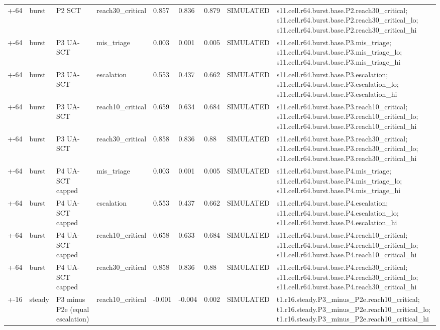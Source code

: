 \begin{table}[t]
\begin{tabular}{lllllllll}
+-64 & burst & P2 SCT & reach30\_critical & 0.857 & 0.836 & 0.879 & SIMULATED & s11.cell.r64.burst.base.P2.reach30\_critical; s11.cell.r64.burst.base.P2.reach30\_critical\_lo; s11.cell.r64.burst.base.P2.reach30\_critical\_hi \\
+-64 & burst & P3 UA-SCT & mis\_triage & 0.003 & 0.001 & 0.005 & SIMULATED & s11.cell.r64.burst.base.P3.mis\_triage; s11.cell.r64.burst.base.P3.mis\_triage\_lo; s11.cell.r64.burst.base.P3.mis\_triage\_hi \\
+-64 & burst & P3 UA-SCT & escalation & 0.553 & 0.437 & 0.662 & SIMULATED & s11.cell.r64.burst.base.P3.escalation; s11.cell.r64.burst.base.P3.escalation\_lo; s11.cell.r64.burst.base.P3.escalation\_hi \\
+-64 & burst & P3 UA-SCT & reach10\_critical & 0.659 & 0.634 & 0.684 & SIMULATED & s11.cell.r64.burst.base.P3.reach10\_critical; s11.cell.r64.burst.base.P3.reach10\_critical\_lo; s11.cell.r64.burst.base.P3.reach10\_critical\_hi \\
+-64 & burst & P3 UA-SCT & reach30\_critical & 0.858 & 0.836 & 0.88 & SIMULATED & s11.cell.r64.burst.base.P3.reach30\_critical; s11.cell.r64.burst.base.P3.reach30\_critical\_lo; s11.cell.r64.burst.base.P3.reach30\_critical\_hi \\
+-64 & burst & P4 UA-SCT capped & mis\_triage & 0.003 & 0.001 & 0.005 & SIMULATED & s11.cell.r64.burst.base.P4.mis\_triage; s11.cell.r64.burst.base.P4.mis\_triage\_lo; s11.cell.r64.burst.base.P4.mis\_triage\_hi \\
+-64 & burst & P4 UA-SCT capped & escalation & 0.553 & 0.437 & 0.662 & SIMULATED & s11.cell.r64.burst.base.P4.escalation; s11.cell.r64.burst.base.P4.escalation\_lo; s11.cell.r64.burst.base.P4.escalation\_hi \\
+-64 & burst & P4 UA-SCT capped & reach10\_critical & 0.658 & 0.633 & 0.684 & SIMULATED & s11.cell.r64.burst.base.P4.reach10\_critical; s11.cell.r64.burst.base.P4.reach10\_critical\_lo; s11.cell.r64.burst.base.P4.reach10\_critical\_hi \\
+-64 & burst & P4 UA-SCT capped & reach30\_critical & 0.858 & 0.836 & 0.88 & SIMULATED & s11.cell.r64.burst.base.P4.reach30\_critical; s11.cell.r64.burst.base.P4.reach30\_critical\_lo; s11.cell.r64.burst.base.P4.reach30\_critical\_hi \\
+-16 & steady & P3 minus P2e (equal escalation) & reach10\_critical & -0.001 & -0.004 & 0.002 & SIMULATED & t1.r16.steady.P3\_minus\_P2e.reach10\_critical; t1.r16.steady.P3\_minus\_P2e.reach10\_critical\_lo; t1.r16.steady.P3\_minus\_P2e.reach10\_critical\_hi \\

\end{tabular}
\end{table}

